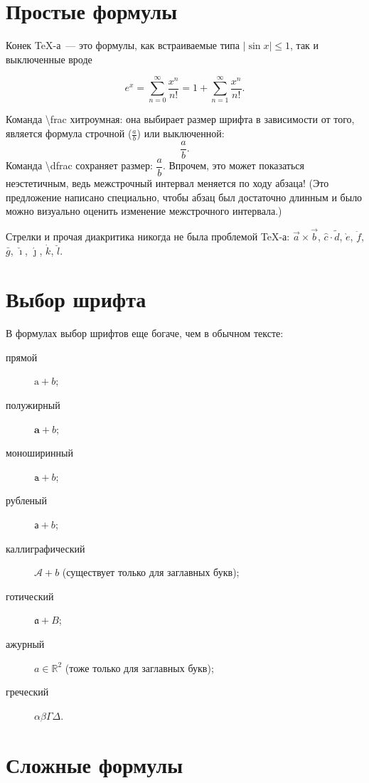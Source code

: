 \documentclass[12pt]{article}
\begin{document}
\section{Простые формулы}

Конек \TeX-а~--- это формулы, как встраиваемые типа $|\sin x| \leqslant 1$, так и выключенные вроде

$$e^x = \sum_{n = 0}^\infty \frac{x^n}{n!} = 1 + \sum_{n = 1}^\infty \frac{x^n}{n!}.$$

Команда \textbackslash frac хитроумная: она выбирает размер шрифта в зависимости от того, является формула строчной ($\frac{a}{b}$) или выключенной: $$\frac{a}{b}.$$ Команда \textbackslash dfrac сохраняет размер: $\dfrac{a}{b}$. Впрочем, это может показаться неэстетичным, ведь межстрочный интервал меняется по ходу абзаца! (Это предложение написано специально, чтобы абзац был достаточно длинным и было можно визуально оценить изменение межстрочного интервала.)

Стрелки и прочая диакритика никогда не была проблемой \TeX-а: $\vec a \times \vec b$, $\hat c \cdot \tilde d$, $\grave e$, $\ddot f$, $\bar g$, $\check \imath$, $\acute \jmath$, $\dot k$, $\breve l$.


\section{Выбор шрифта}

В формулах выбор шрифтов еще богаче, чем в обычном тексте:
\begin{description}
\item[прямой] $\mathrm a + b$;
\item[полужирный] $\mathbf a + b$;
\item[моноширинный] $\mathtt a + b$;
\item[рубленый] $\mathsf a + b$;
\item[каллиграфический] $\mathcal A + b$ (существует только для заглавных букв);
\item[готический] $\mathfrak a + B$;
\item[ажурный] $a \in \mathbb R^2$ (тоже только для заглавных букв);
\item[греческий] $\alpha \beta \Gamma \Delta$.
\end{description}


\section{Сложные формулы}
\end{document}
